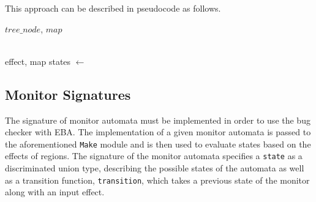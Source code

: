 \newpar This approach can be described in pseudocode as follows.

\begin{algorithm}[H]
\begin{algorithmic}
     {$tree\_node$, $map$} 
            \EndIf
            

        \EndIf      
    \EndFunction
    \\
     {effect, map}
        \State states $\gets$ 
    \EndFunction
    \\
\end{algorithmic}
\end{algorithm}

\subsection{Monitor Signatures}

The signature of monitor automata must be implemented in order to use the bug checker with EBA. The implementation of a given monitor automata is passed to the aforementioned \texttt{Make} module and is then used to evaluate states based on the effects of regions. The signature of the monitor automata specifies a \texttt{state} as a discriminated union type, describing the possible states of the automata as well as a transition function, \texttt{transition}, which takes a previous state of the monitor along with an input effect. 

